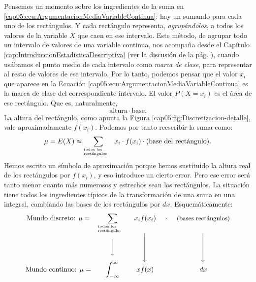 Pensemos un momento sobre los ingredientes de la suma en \ref{cap05:ecu:ArgumentacionMediaVariableContinua}: hay un sumando para cada uno de los rectángulos. Y cada rectángulo representa, {\em agrupándolos}, a todos  los valores de la variable $X$ que caen en ese intervalo. Este método, de agrupar todo un intervalo de valores de una variable continua, nos acompaña desde el Capítulo \ref{cap:IntroduccionEstadisticaDescriptiva} (ver la discusión de la pág. \pageref{cap01:tabla:FrecuenciaPesoClase}), cuando usábamos el punto medio de cada intervalo como {\em marca de clase}, para representar al resto de valores de ese intervalo. Por lo tanto, podemos pensar que el valor $x_i$ que aparece en la Ecuación \ref{cap05:ecu:ArgumentacionMediaVariableContinua} es la marca de clase del correspondiente intervalo. El valor $P(X=x_i)$ es el área de ese rectángulo. Que es, naturalmente,
\[\mbox{altura}\cdot\mbox{base}.\]
La altura del rectángulo, como apunta la Figura \ref{cap05:fig:Discretizacion-detalle}, vale aproximadamente $f(x_i)$. Podemos por tanto reescribir la suma como:
   \[\mu=E(X)\approx \sum_{\begin{minipage}{1.5cm}\tiny todos los\\ rectángulos\end{minipage}} x_i\cdot f(x_i)\cdot\mbox{(base del rectángulo)}.\]
Hemos escrito un símbolo de aproximación porque hemos sustituido la altura real de los rectángulos por $f(x_i)$, y eso introduce un cierto error. Pero ese error será tanto menor cuanto más numerosos y estrechos sean los rectángulos. La situación tiene todos los ingredientes típicos de la transformación de una suma en una integral, cambiando las bases de los rectángulos por $dx$. Esquemáticamente:
\begin{equation}\label{cap05:ecu:EsquemaMediaDiscretoAContinuo}
\begin{array}{ccccc}
\mbox{Mundo discreto: }\mu=&\displaystyle\sum_{\begin{minipage}{1.5cm}\tiny todos los\\ rectángulos\end{minipage}}& x_i f(x_i)&\cdot&\mbox{\small (bases rectángulos)}\\
&\left\downarrow\rule{0cm}{0.5cm}\right.&\left\downarrow\rule{0cm}{0.8cm}\right.&\quad &\left\downarrow\rule{0cm}{0.8cm}\right.\\[5mm]
\mbox{Mundo continuo: }\mu=&\displaystyle\int_{-\infty}^{\infty}&
x f(x)&&
dx
\end{array}
\end{equation}

